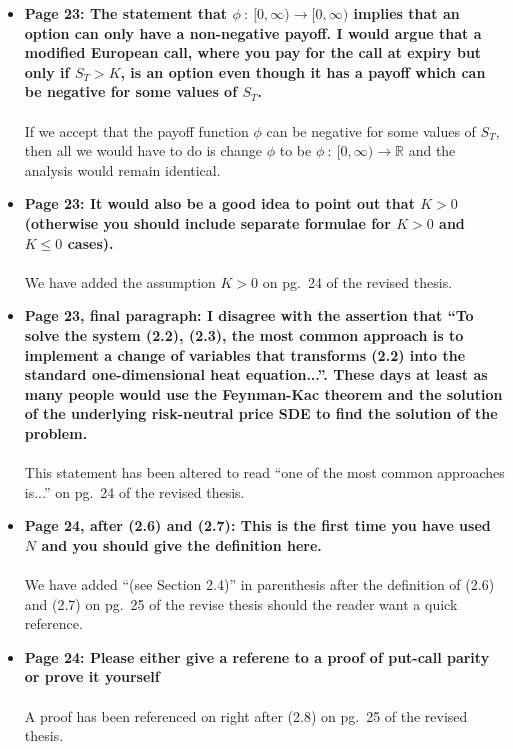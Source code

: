\documentclass{article}
\begin{document}
\begin{enumerate}
\begin{itemize}
			\item{\textbf{Page 23: The statement that $\phi \ : \ [0,\infty) \rightarrow [0,\infty)$ implies that an option can only have a non-negative payoff. I would argue that a modified European call, where you pay for the call at expiry but only if $S_T > K$, is an option even though it has a payoff which can be negative for some values of $S_T$.\\\\}}
			If we accept that the payoff function $\phi$ can be negative for some values of $S_T$, then all we would have to do is change $\phi$ to be $\phi \ : \ [0,\infty) \rightarrow \mathbb{R}$ and the analysis would remain identical.
			
			\item{\textbf{Page 23: It would also be a good idea to point out that $K > 0$ (otherwise you should include separate formulae for $K > 0$ and $K \leq 0 $ cases).\\\\}}
			We have added the assumption $K > 0$ on pg.~24 of the revised thesis.
			
			\item{\textbf{Page 23, final paragraph: I disagree with the assertion that ``To solve the system (2.2), (2.3), the most common approach is to implement a change of variables that transforms (2.2) into the standard one-dimensional heat equation...''. These days at least as many people would use the Feynman-Kac theorem and the solution of the underlying risk-neutral price SDE to find the solution of the problem.\\\\}}
			This statement has been altered to read ``one of the most common approaches is...'' on pg.~24 of the revised thesis.
			
			\item{\textbf{Page 24, after (2.6) and (2.7): This is the first time you have used $N$ and you should give the definition here.\\\\}}
			We have added ``(see Section 2.4)'' in parenthesis after the definition of (2.6) and (2.7) on pg.~25 of the revise thesis should the reader want a quick reference.
			
			\item{\textbf{Page 24: Please either give a referene to a proof of put-call parity or prove it yourself\\\\}}
			A proof has been referenced on right after (2.8) on pg.~25 of the revised thesis.
			

\end{itemize}
\end{enumerate}
\end{document}
